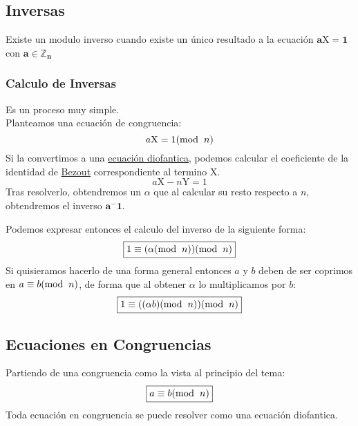 \subsection{Inversas}
\noindent Existe un modulo inverso cuando existe un único resultado a la ecuación \(\boxed{\mathbf{{a\mathrm{X} = 1}}}\) con \(\mathbf{a \in \mathbb{Z}_n}\)
\subsubsection{Calculo de Inversas}
\noindent Es un proceso muy simple.\\ Planteamos una ecuación de congruencia:
\[
        a\mathrm{X} = 1 (\textnormal{mod}\hspace{2mm}n)
\]
\noindent Si la convertimos a una \underline{ecuación diofantica}, podemos calcular el coeficiente de la identidad de \underline{Bezout} correspondiente al termino \(\mathrm{X}\).
\[
        a\mathrm{X} - n\mathrm{Y} = 1
\]
Tras resolverlo, obtendremos un \(\alpha\) que al calcular su resto respecto a \(n\), obtendremos el inverso \(\mathbf{a^-1}\).\par
\noindent Podemos expresar entonces el calculo del inverso de la siguiente forma:
\[
        \boxed{1 \equiv (\alpha (\textnormal{mod}\hspace{2mm}n))(\textnormal{mod}\hspace{2mm}n)}
\]
\noindent Si quisieramos hacerlo de una forma general entonces \(a\) y \(b\) deben de ser coprimos en \(a \equiv b(\textnormal{mod}\hspace{2mm}n)\), de forma que al obtener \(\alpha\) lo multiplicamos por \(b\):
\[
        \boxed{1 \equiv ((\alpha b) (\textnormal{mod}\hspace{2mm}n))(\textnormal{mod}\hspace{2mm}n)}
\]
\subsection{Ecuaciones en Congruencias}
\noindent Partiendo de una congruencia como la vista al principio del tema:
\[
        \boxed{a \equiv b(\textnormal{mod}\hspace{2mm}n)}
\]
\noindent Toda ecuación en congruencia se puede resolver como una ecuación diofantica.
